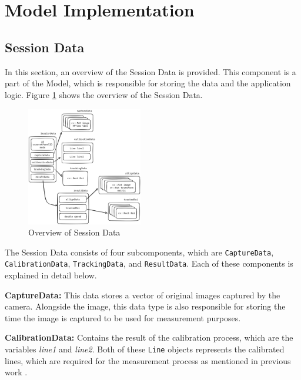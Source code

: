\section{Model Implementation}
\label{sec:model_implementation}

\subsection{Session Data}
\label{subsec:session_data}

In this section, an overview of the Session Data is provided. This component is a part of the Model, which is responsible for storing the data and the application logic. Figure \ref{fig:sessiondata_overview} shows the overview of the Session Data.

\begin{figure}[!ht]
    \centering
    \includegraphics[width=0.45\textwidth]{texs/Part2/chapter4/image/sessiondata.png}
    \caption{Overview of Session Data}
    \label{fig:sessiondata_overview}
\end{figure}

The Session Data consists of four subcomponents, which are \texttt{CaptureData}, \texttt{CalibrationData}, \texttt{TrackingData}, and \texttt{ResultData}. Each of these components is explained in detail below.

\textbf{CaptureData:} This data stores a vector of original images captured by the camera. Alongside the image, this data type is also responsible for storing the time the image is captured to be used for measurement purposes.

\textbf{CalibrationData:} Contains the result of the calibration process, which are the variables \textit{line1} and \textit{line2}. Both of these \texttt{Line} objects represents the calibrated lines, which are required for the measurement process as mentioned in previous work \cite{Sabtu_2023}.

